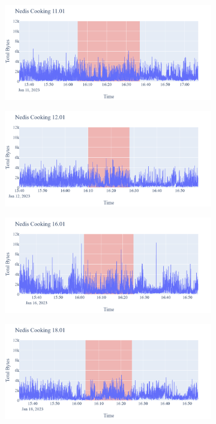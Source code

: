 \begin{figure}[H]
\begin{subfigure}[b]{0.47\textwidth}
        \centering
        \includegraphics[width=1.2\hsize]{figures/Nedis_Cooking_Bytes_11.01.png}
    \end{subfigure}
    \begin{subfigure}[b]{0.47\textwidth}
        \centering
        \includegraphics[width=1.2\hsize]{figures/Nedis_Cooking_Bytes_12.01.png}
    \end{subfigure}
    \begin{subfigure}[b]{0.47\textwidth}
        \centering
        \includegraphics[width=1.2\hsize]{figures/Nedis_Cooking_Bytes_16.01.png}
    \end{subfigure}
    \begin{subfigure}[b]{0.47\textwidth}
        \centering
        \includegraphics[width=1.2\hsize]{figures/Nedis_Cooking_Bytes_18.01.png}

\end{subfigure}
\end{figure}
